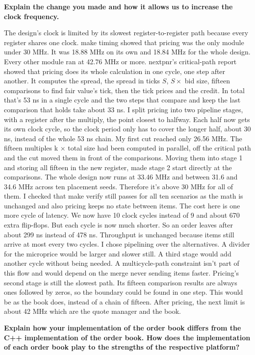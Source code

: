 \documentclass[11pt]{article}
\newcommand{\prompt}[1]{\par\medskip\noindent\textbf{#1}\par\smallskip\noindent\ignorespaces}
\begin{document}
\prompt{Explain the change you made and how it allows us to increase the clock frequency.}
The design's clock is limited by its slowest register-to-register path because every register shares one clock. make timing showed that pricing was the only module under 30 MHz. It was 18.88 MHz on its own and 18.84 MHz for the whole design. Every other module ran at 42.76 MHz or more. nextpnr's critical-path report showed that pricing does its whole calculation in one cycle, one step after another. It computes the spread, the spread in ticks $S$, $S \times$ bid size, fifteen comparisons to find fair value's tick, then the tick prices and the credit. In total that's 53 ns in a single cycle and the two steps that compare and keep the last comparison that holds take about 33 ns. I split pricing into two pipeline stages, with a register after the multiply, the point closest to halfway. Each half now gets its own clock cycle, so the clock period only has to cover the longer half, about 30 ns, instead of the whole 53 ns chain. My first cut reached only 26.56 MHz. The fifteen multiples k × total size had been computed in parallel, off the critical path and the cut moved them in front of the comparisons. Moving them into stage 1 and storing all fifteen in the new register, made stage 2 start directly at the comparisons. The whole design now runs at 33.46 MHz and between 31.6 and 34.6 MHz across ten placement seeds. Therefore it's above 30 MHz for all of them. I checked that make verify still passes for all ten scenarios as the math is unchanged and also pricing keeps no state between items. The cost here is one more cycle of latency. We now have 10 clock cycles instead of 9 and about 670 extra flip-flops.
But each cycle is now much shorter. So an order leaves after about 299 ns instead of 478 ns. Throughput is unchanged because items still arrive at most every two cycles. I chose pipelining over the alternatives. A divider for the microprice would be larger and slower still. A third stage would add another cycle without being needed. A multicycle-path constraint isn't part of this flow and would depend on the merge never sending items faster. Pricing's second stage is still the slowest path. Its fifteen comparison results are always ones followed by zeros, so the boundary could be found in one step. This would be as the book does, instead of a chain of fifteen. After pricing, the next limit is about 42 MHz which are the quote manager and the book.
\prompt{Explain how your implementation of the order book differs from the C++ implementation of the order book. How does the implementation of each order book play to the strengths of the respective platform?}
\end{document}
